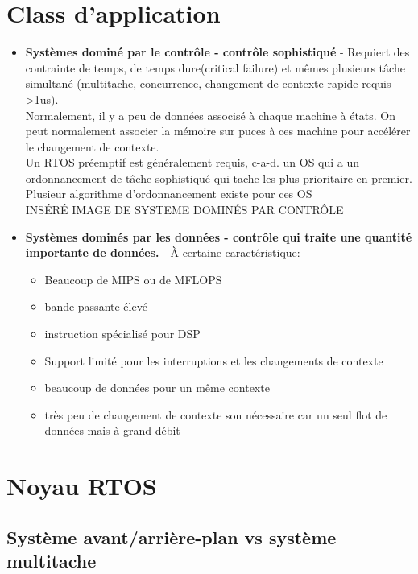 \documentclass[oneside]{book}
\begin{document}
    \section{Class d'application}
    \begin{itemize}
        \item \textbf{Systèmes dominé par le contrôle - contrôle sophistiqué} - Requiert des contrainte de temps, de temps dure(critical failure) et mêmes plusieurs tâche simultané (multitache, concurrence, changement de contexte rapide requis >1us).\\
        
        Normalement, il y a peu de données associsé à chaque machine à états. On peut normalement associer la mémoire sur puces à ces machine pour accélérer le changement de contexte.\\
        
        Un RTOS préemptif est généralement requis, c-a-d. un OS qui a un ordonnancement de tâche sophistiqué qui tache les plus prioritaire en premier. Plusieur algorithme d'ordonnancement existe pour ces OS\\
        
        INSÉRÉ IMAGE DE SYSTEME DOMINÉS PAR CONTRÔLE
        \item \textbf{Systèmes dominés par les données - contrôle qui traite une quantité importante de données.} - À certaine caractéristique:
        \begin{itemize}
            \item Beaucoup de MIPS ou de MFLOPS
            \item bande passante élevé
            \item instruction spécialisé pour DSP
            \item Support limité pour les interruptions et les changements de contexte
            \item beaucoup de données pour un même contexte
            \item très peu de changement de contexte son nécessaire car un seul flot de données mais à grand débit
        \end{itemize}
    \end{itemize}
    
    \section{Noyau RTOS}
    \subsection{Système avant/arrière-plan vs système multitache}
\end{document}
